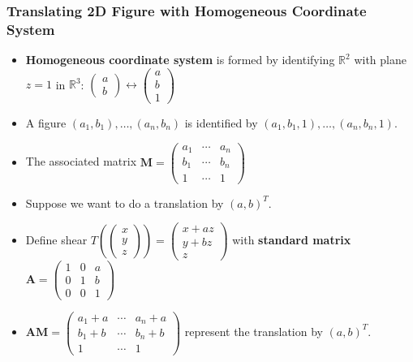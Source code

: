 \documentclass[../ma2001_notes.tex]{subfiles}
\begin{document}
\subsubsection{Translating 2D Figure with Homogeneous Coordinate System}
\begin{itemize}
	\item\textbf{Homogeneous coordinate system} is formed by identifying \(\mathbb{R}^2\) with plane \(z=1\) in \(\mathbb{R}^3\): \(\begin{pmatrix}
		a \\ b
	\end{pmatrix}\leftrightarrow\begin{pmatrix}
		a \\ b \\ 1
	\end{pmatrix}\)
	\item A figure \((a_1,b_1),\ldots,(a_n,b_n)\) is identified by \((a_1,b_1,1),\ldots,(a_n,b_n,1)\).
	\item The associated matrix \(\bm{M}=\begin{pmatrix}
		a_1 & \cdots & a_n \\
		b_1 & \cdots & b_n \\
		1 & \cdots & 1
	\end{pmatrix}\)
	\item Suppose we want to do a translation by \((a,b)^T\).
	\item Define shear \(T\left(\begin{pmatrix}
		x \\ y \\ z
	\end{pmatrix}\right)=\begin{pmatrix}
		x+az \\ y+bz \\ z
	\end{pmatrix}\) with \textbf{standard matrix} \(\bm{A}=\begin{pmatrix}
		1 & 0 & a \\
		0 & 1 & b \\
		0 & 0 & 1
	\end{pmatrix}\)
	\item\(\bm{AM}=\begin{pmatrix}
		a_1+a & \cdots & a_n+a \\
		b_1+b & \cdots & b_n+b \\
		1 & \cdots & 1
	\end{pmatrix}\) represent the translation by \((a,b)^T\).
\end{itemize}
\end{document}
